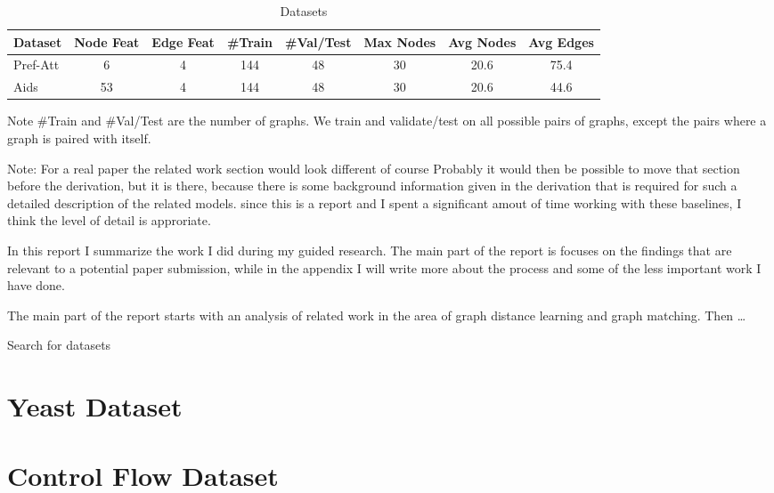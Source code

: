 \appendix
\appendixpage


\begin{table}[htbp]
    \addtolength{\tabcolsep}{-1pt}
    \fontsize{9pt}{10.25pt}\selectfont
    \centering
    \renewcommand{\arraystretch}{1.2}
    \begin{tabular}{|l|c|c|c|c|c|c|c|}
        \hline
        Dataset & Node Feat & Edge Feat & \#Train & \#Val/Test & Max Nodes & Avg Nodes & Avg Edges \\
        \hline
        Pref-Att & 6 & 4 & 144 & 48 & 30 & 20.6 & 75.4 \\ %
        \hline
        Aids & 53 & 4 & 144 & 48 & 30 & 20.6 & 44.6 \\ %
        \hline
    \end{tabular}
    \caption{Datasets}
    \label{tab:ex1-data}
\end{table}

Note \#Train and \#Val/Test are the number of graphs. We train and validate/test on all possible pairs of graphs, except the pairs where a graph is paired with itself.

Note: For a real paper the related work section would look different of course
Probably it would then be possible to move that section before the derivation, but it is there, because there is some background information given in the derivation that is required for such a detailed description of the related models.
since this is a report and I spent a significant amout of time working with these baselines, I think the level of detail is approriate.


In this report I summarize the work I did during my guided research. The main part of the report is focuses on the findings that are relevant to a potential paper submission, while in the appendix I will write more about the process and some of the less important work I have done.

The main part of the report starts with an analysis of related work in the area of graph distance learning and graph matching. Then \dots


Search for datasets

\section{Yeast Dataset}

\section{Control Flow Dataset}
